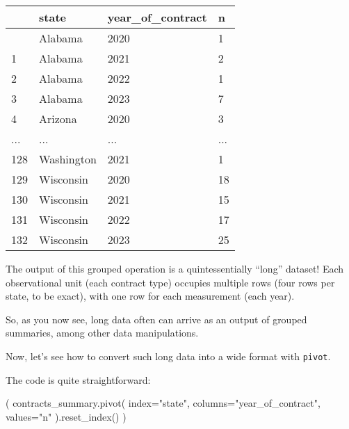 \documentclass[
  letterpaper,
  DIV=11,
  numbers=noendperiod]{scrreprt}
\newenvironment{Shaded}{\begin{snugshade}}{\end{snugshade}}
\newcommand{\NormalTok}[1]{\textcolor[rgb]{0.00,0.23,0.31}{#1}}
\newcommand{\OperatorTok}[1]{\textcolor[rgb]{0.37,0.37,0.37}{#1}}
\newcommand{\StringTok}[1]{\textcolor[rgb]{0.13,0.47,0.30}{#1}}
\begin{document}
\begin{longtable}[]{@{}llll@{}}
\toprule\noalign{}
& state & year\_of\_contract & n \\
\midrule\noalign{}
\endhead
\bottomrule\noalign{}
\endlastfoot
0 & Alabama & 2020 & 1 \\
1 & Alabama & 2021 & 2 \\
2 & Alabama & 2022 & 1 \\
3 & Alabama & 2023 & 7 \\
4 & Arizona & 2020 & 3 \\
... & ... & ... & ... \\
128 & Washington & 2021 & 1 \\
129 & Wisconsin & 2020 & 18 \\
130 & Wisconsin & 2021 & 15 \\
131 & Wisconsin & 2022 & 17 \\
132 & Wisconsin & 2023 & 25 \\
\end{longtable}

The output of this grouped operation is a quintessentially ``long''
dataset! Each observational unit (each contract type) occupies multiple
rows (four rows per state, to be exact), with one row for each
measurement (each year).

So, as you now see, long data often can arrive as an output of grouped
summaries, among other data manipulations.

Now, let's see how to convert such long data into a wide format with
\texttt{pivot}.

The code is quite straightforward:

\begin{Shaded}
\begin{Highlighting}[]
\NormalTok{(}
\NormalTok{    contracts\_summary.pivot(}
\NormalTok{        index}\OperatorTok{=}\StringTok{"state"}\NormalTok{, columns}\OperatorTok{=}\StringTok{"year\_of\_contract"}\NormalTok{, values}\OperatorTok{=}\StringTok{"n"}
\NormalTok{    ).reset\_index()}
\NormalTok{)}
\end{Highlighting}
\end{Shaded}
\end{document}
